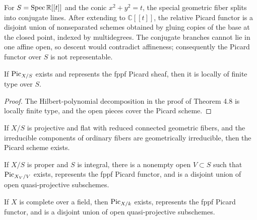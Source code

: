 \begin{example}\label{kps-ex-mumford}
For $S=\operatorname{Spec}\mathbb R[[t]]$ and the conic $x^2+y^2=t$, the special geometric
fiber splits into conjugate lines. After extending to $\mathbb C[[t]]$, the
relative Picard functor is a disjoint union of nonseparated schemes obtained by
gluing copies of the base at the closed point, indexed by multidegrees. The
conjugate branches cannot lie in one affine open, so descent would contradict
affineness; consequently the Picard functor over $S$ is not representable.
\end{example}

\begin{proposition}\label{kps-prop-lft}
If $\operatorname{Pic}_{X/S}$ exists and represents the fppf Picard sheaf, then it is locally
of finite type over $S$.
\end{proposition}
\begin{proof}
The Hilbert-polynomial decomposition in the proof of Theorem 4.8 is locally
finite type, and the open pieces cover the Picard scheme.
\end{proof}

\begin{theorem}\label{kps-thm-mumford}
If $X/S$ is projective and flat with reduced connected geometric fibers, and the
irreducible components of ordinary fibers are geometrically irreducible, then
the Picard scheme exists.
\notready
\end{theorem}

\begin{theorem}\label{kps-thm-relative-representability}
If $X/S$ is proper and $S$ is integral, there is a nonempty open $V\subset S$
such that $\operatorname{Pic}_{X_V/V}$ exists, represents the fppf Picard functor, and is a
disjoint union of open quasi-projective subschemes.
\notready
\end{theorem}

\begin{corollary}\label{kps-cor-complete-representability}
If $X$ is complete over a field, then $\operatorname{Pic}_{X/k}$ exists, represents the fppf
Picard functor, and is a disjoint union of open quasi-projective subschemes.
\end{corollary}

